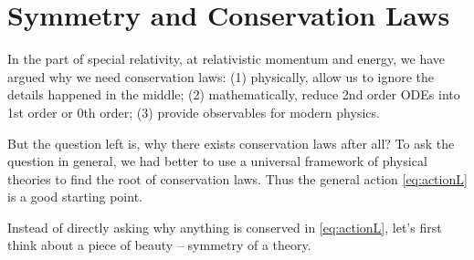 
\section{Symmetry and Conservation Laws}

In the part of special relativity, at relativistic momentum and energy, we have argued why we need conservation laws: (1) physically, allow us to ignore the details happened in the middle; (2) mathematically, reduce 2nd order ODEs into 1st order or 0th order; (3) provide observables for modern physics. 

But the question left is, why there exists conservation laws after all? To ask the question in general, we had better to use a universal framework of physical theories to find the root of conservation laws. Thus the general action \eqref{eq:actionL} is a good starting point.

Instead of directly asking why anything is conserved in \eqref{eq:actionL}, let's first think about a piece of beauty -- symmetry of a theory.

